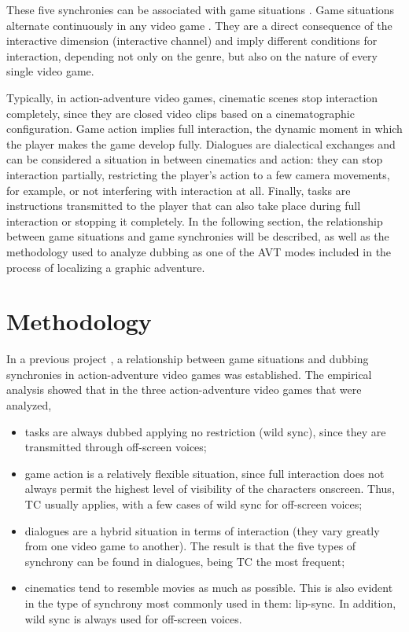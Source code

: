 \documentclass[output=paper]{langsci/langscibook}
\begin{document}
These five synchronies can be associated with game situations \parencite[90]{mejias19}. Game situations alternate continuously in any video game \parencite[150]{pujol15}. They are a direct consequence of the interactive dimension (interactive channel) and imply different conditions for interaction, depending not only on the genre, but also on the nature of every single video game.

Typically, in action-adventure video games, cinematic scenes stop interaction completely, since they are closed video clips based on a cinematographic configuration. Game action implies full interaction, the dynamic moment in which the player makes the game develop fully. Dialogues are dialectical exchanges and can be considered a situation in between cinematics and action: they can stop interaction partially, restricting the player’s action to a few camera movements, for example, or not interfering with interaction at all. Finally, tasks are instructions transmitted to the player that can also take place during full interaction or stopping it completely. In the following section, the relationship between game situations and game synchronies will be described, as well as the methodology used to analyze dubbing as one of the AVT modes included in the process of localizing a graphic adventure.

\section{Methodology}\label{lmc:meth}

In a previous project \parencite{mejias19}, a relationship between game situations and dubbing synchronies in action-adventure video games was established. The empirical analysis showed that in the three action-adventure video games that were analyzed,

\begin{itemize}
  \item tasks are always dubbed applying no restriction (wild sync), since they are transmitted through off-screen voices;
  \item game action is a relatively flexible situation, since full interaction does not always permit the highest level of visibility of the characters onscreen. Thus, TC usually applies, with a few cases of wild sync for off-screen voices;
  \item dialogues are a hybrid situation in terms of interaction (they vary greatly from one video game to another). The result is that the five types of synchrony can be found in dialogues, being TC the most frequent;
  \item cinematics tend to resemble movies as much as possible. This is also evident in the type of synchrony most commonly used in them: lip-sync. In addition, wild sync is always used for off-screen voices.
\end{itemize}
\end{document}
